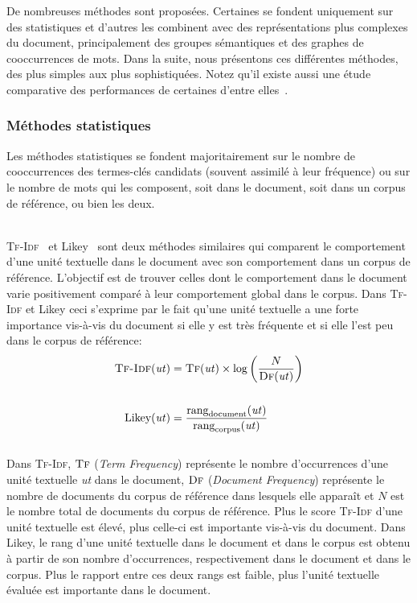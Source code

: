       De nombreuses méthodes sont proposées. Certaines se fondent uniquement
      sur des statistiques et d'autres les combinent avec des représentations
      plus complexes du document, principalement des groupes sémantiques et des
      graphes de cooccurrences de mots. Dans la suite, nous présentons ces
      différentes méthodes, des plus simples aux plus sophistiquées. Notez qu'il
      existe aussi une étude comparative des performances de certaines d'entre
      elles~\cite{hassan2010conundrums}.

      \subsubsection{Méthodes statistiques}
      \label{subsubsec:main-state_of_the_art-automatic_keyphrase_extraction-unsupervised_keyphrase_extraction-statistical_approaches}
        Les méthodes statistiques se fondent majoritairement sur le nombre de
        cooccurrences des termes-clés candidats (souvent assimilé à leur
        fréquence) ou sur le nombre de mots qui les composent, soit dans le
        document, soit dans un corpus de référence, ou bien les deux.

        ~\\\textsc{Tf-Idf}~\cite{jones1972tfidf} et Likey~\cite{paukkeri2010likey}
        sont deux méthodes similaires qui comparent le comportement d'une unité
        textuelle dans le document avec son comportement dans un corpus de
        référence. L'objectif est de trouver celles dont le
        comportement dans le document varie positivement comparé à leur
        comportement global dans le corpus. Dans \textsc{Tf-Idf} et Likey ceci
        s'exprime par le fait qu'une unité textuelle a une forte importance
        vis-à-vis du document si elle y est très fréquente et si elle l'est
        peu dans le corpus de référence:
        \begin{align}
          \text{\textsc{Tf-Idf}}(\text{\textit{ut}}) &= \textsc{Tf}(\text{\textit{ut}}) \times \log\left(\frac{N}{\textsc{Df}(\text{\textit{ut}})}\right) \label{math:tfidf}\\
          \notag\\
          \text{Likey}(\text{\textit{ut}}) &= \frac{\text{rang}_{\text{document}}(\text{\textit{ut}})}{\text{rang}_{\text{corpus}}(\text{\textit{ut}})} \label{math:likey}
        \end{align}\\
        Dans \textsc{Tf-Idf}, $\textsc{Tf}$ (\textit{Term Frequency}) représente
        le nombre d'occurrences d'une unité textuelle \textit{ut} dans le
        document, $\textsc{Df}$ (\textit{Document Frequency}) représente le
        nombre de documents du corpus de référence dans lesquels elle apparaît
        et $N$ est le nombre total de documents du corpus de référence. Plus le
        score \textsc{Tf-Idf} d'une unité textuelle est élevé, plus celle-ci est
        importante vis-à-vis du document. Dans Likey, le rang d'une unité
        textuelle dans le document et dans le corpus est obtenu à partir de son
        nombre d'occurrences, respectivement dans le document et dans le corpus.
        Plus le rapport entre ces deux rangs est faible, plus l'unité textuelle
        évaluée est importante dans le document.

